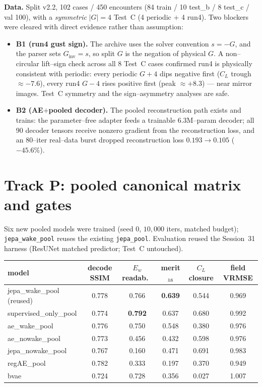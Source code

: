 \documentclass[11pt]{article}
\begin{document}
\textbf{Data.} Split v2.2, 102 cases / 450 encounters (84 train / 10 test\_b / 8 test\_c /
val 100), with a \emph{symmetric} $|G|{=}4$ Test~C (4 periodic $+$ 4 run4). Two blockers were
cleared with direct evidence rather than assumption:

\begin{itemize}[leftmargin=1.4em,itemsep=1pt]
\item \textbf{B1 (run4 gust sign).} The archive uses the solver convention $s=-G$, and the
parser sets $G_{\text{inv}}=s$, so split $G$ is the negation of physical $G$. A non--circular
lift--sign check across all 8 Test~C cases confirmed run4 is physically consistent with periodic:
every periodic $G{+}4$ dips negative first ($C_L$ trough $\approx -7.6$), every run4 $G{-}4$
rises positive first (peak $\approx +8.3$) --- near mirror images. Test~C symmetry and the
sign--asymmetry analyses are safe.
\item \textbf{B2 (AE$+$pooled decoder).} The pooled reconstruction path exists and trains: the
parameter--free adapter feeds a trainable $6.3$M--param decoder; all 90 decoder tensors receive
nonzero gradient from the reconstruction loss, and an 80--iter real--data burst dropped
reconstruction loss $0.193\to 0.105$ ($-45.6\%$).
\end{itemize}

\section{Track P: pooled canonical matrix and gates}

Six new pooled models were trained (seed 0, $10{,}000$ iters, matched budget); \texttt{jepa\_wake\_pool}
reuses the existing \texttt{jepa\_pool}. Evaluation reused the Session~31 harness (ResUNet
matched predictor; Test~C untouched).

\begin{center}
\begin{tabular}{@{}lccccc@{}}
\toprule
model & decode SSIM & $E_w$ readab.\ & merit$_{h8}$ & $C_L$ closure & field VRMSE \\
\midrule
jepa\_wake\_pool (reused) & 0.778 & 0.766 & \textbf{0.639} & 0.544 & 0.969 \\
supervised\_only\_pool    & 0.774 & \textbf{0.792} & 0.637 & 0.680 & 0.992 \\
ae\_wake\_pool            & 0.776 & 0.750 & 0.548 & 0.380 & 0.976 \\
ae\_nowake\_pool          & 0.773 & 0.456 & 0.432 & 0.598 & 0.976 \\
jepa\_nowake\_pool        & 0.767 & 0.160 & 0.471 & 0.691 & 0.983 \\
regAE\_pool               & 0.782 & 0.333 & 0.197 & 0.370 & 0.949 \\
bvae                      & 0.724 & 0.728 & 0.356 & 0.027 & 1.007 \\
\bottomrule
\end{tabular}
\end{center}
\end{document}
